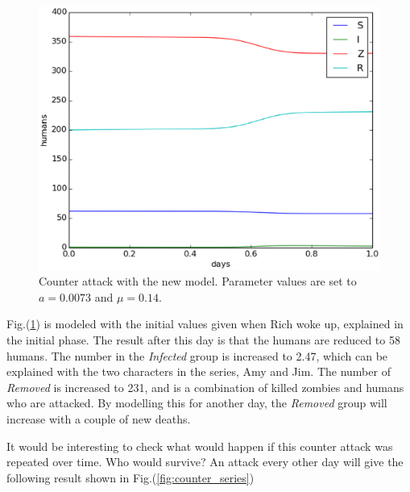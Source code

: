 \documentclass[%
twoside,                 %
final,                   %
10pt]{article}
\begin{document}
\begin{figure}[ht]
  \centerline{\includegraphics[width=0.9\linewidth]{plots/WD_zombie_counter_2.eps}}
  \caption{
  \label{fig:zombie_counter_2} Counter attack with the new model. Parameter values are set to $a=0.0073$ and $\mu=0.14$.
  }
\end{figure}


Fig.(\ref{fig:zombie_counter_2}) is modeled with the initial values given when Rich woke up, explained in the initial phase. The result after this day is that the humans are reduced to 58 humans. The number in the \emph{Infected} group is increased to 2.47, which can be explained with the two characters in the series, Amy and Jim. The number of \emph{Removed} is increased to 231, and is a combination of killed zombies and humans who are attacked. By modelling this for another day, the \emph{Removed} group will increase with a couple of new deaths. 


\vspace{3mm}




\vspace{3mm}


It would be interesting to check what would happen if this counter attack was repeated over time. Who would survive? An attack every other day will give the following result shown in Fig.(\ref{fig:counter_series})
\end{document}
